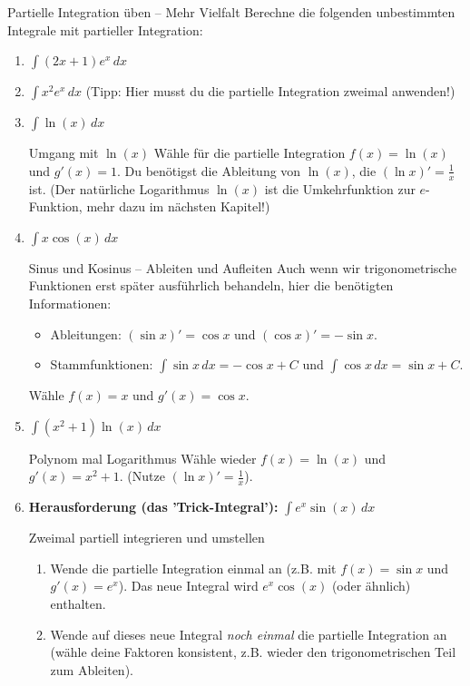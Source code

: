 \begin{aufgabenumgebung}{Partielle Integration üben – Mehr Vielfalt}
Berechne die folgenden unbestimmten Integrale mit partieller Integration:
\begin{enumerate}
    \item $\int (2x+1)e^x \,dx$
    \item $\int x^2 e^x \,dx$ (Tipp: Hier musst du die partielle Integration zweimal anwenden!)
    \item $\int \ln(x) \,dx$
        \begin{tippumgebung}{Umgang mit $\ln(x)$}
        Wähle für die partielle Integration $f(x)=\ln(x)$ und $g'(x)=1$. Du benötigst die Ableitung von $\ln(x)$, die $(\ln x)' = \frac{1}{x}$ ist. (Der natürliche Logarithmus $\ln(x)$ ist die Umkehrfunktion zur $e$-Funktion, mehr dazu im nächsten Kapitel!)
        \end{tippumgebung}
    \item $\int x \cos(x) \,dx$
        \begin{tippumgebung}{Sinus und Kosinus – Ableiten und Aufleiten}
        Auch wenn wir trigonometrische Funktionen erst später ausführlich behandeln, hier die benötigten Informationen:
        \begin{itemize}
            \item Ableitungen: $(\sin x)' = \cos x$ und $(\cos x)' = -\sin x$.
            \item Stammfunktionen: $\int \sin x \,dx = -\cos x + C$ und $\int \cos x \,dx = \sin x + C$.
        \end{itemize}
        Wähle $f(x)=x$ und $g'(x)=\cos x$.
        \end{tippumgebung}
    \item $\int (x^2+1)\ln(x) \,dx$
        \begin{tippumgebung}{Polynom mal Logarithmus}
        Wähle wieder $f(x)=\ln(x)$ und $g'(x)=x^2+1$. (Nutze $(\ln x)' = \frac{1}{x}$).
        \end{tippumgebung}
    \item \textbf{Herausforderung (das 'Trick-Integral'):} $\int e^x \sin(x) \,dx$
        \begin{tippumgebung}{Zweimal partiell integrieren und umstellen}
        \begin{enumerate}
            \item Wende die partielle Integration einmal an (z.B. mit $f(x)=\sin x$ und $g'(x)=e^x$). Das neue Integral wird $e^x \cos(x)$ (oder ähnlich) enthalten.
            \item Wende auf dieses neue Integral \textit{noch einmal} die partielle Integration an (wähle deine Faktoren konsistent, z.B. wieder den trigonometrischen Teil zum Ableiten).

\end{enumerate}
\end{tippumgebung}
\end{enumerate}
\end{aufgabenumgebung}
